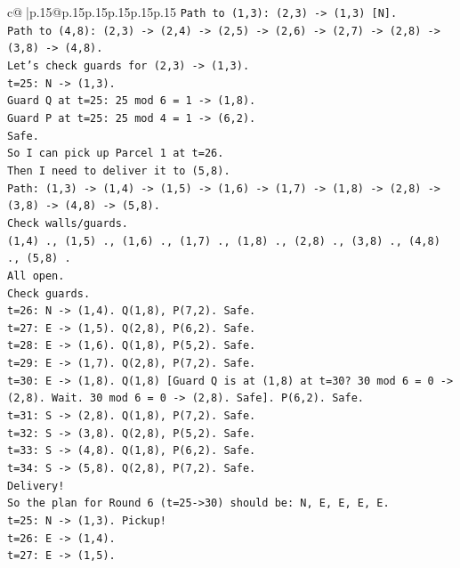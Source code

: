 \documentclass{article}
\begin{document}
{\begin{supertabular}{c@{$\;$}|p{.15\linewidth}@{}p{.15\linewidth}p{.15\linewidth}p{.15\linewidth}p{.15\linewidth}p{.15\linewidth}}
{{{\texttt{Path to (1,3): (2,3) {-}> (1,3) {[}N{]}.} \\
\texttt{Path to (4,8): (2,3) {-}> (2,4) {-}> (2,5) {-}> (2,6) {-}> (2,7) {-}> (2,8) {-}> (3,8) {-}> (4,8).} \\
\texttt{Let's check guards for (2,3) {-}> (1,3).} \\
\texttt{t=25: N {-}> (1,3).} \\
\texttt{Guard Q at t=25: 25 mod 6 = 1 {-}> (1,8).} \\
\texttt{Guard P at t=25: 25 mod 4 = 1 {-}> (6,2).} \\
\texttt{Safe.} \\
\texttt{So I can pick up Parcel 1 at t=26.} \\
\texttt{Then I need to deliver it to (5,8).} \\
\texttt{Path: (1,3) {-}> (1,4) {-}> (1,5) {-}> (1,6) {-}> (1,7) {-}> (1,8) {-}> (2,8) {-}> (3,8) {-}> (4,8) {-}> (5,8).} \\
\texttt{Check walls/guards.} \\
\texttt{(1,4) ., (1,5) ., (1,6) ., (1,7) ., (1,8) ., (2,8) ., (3,8) ., (4,8) ., (5,8) .} \\
\texttt{All open.} \\
\texttt{Check guards.} \\
\texttt{t=26: N {-}> (1,4). Q(1,8), P(7,2). Safe.} \\
\texttt{t=27: E {-}> (1,5). Q(2,8), P(6,2). Safe.} \\
\texttt{t=28: E {-}> (1,6). Q(1,8), P(5,2). Safe.} \\
\texttt{t=29: E {-}> (1,7). Q(2,8), P(7,2). Safe.} \\
\texttt{t=30: E {-}> (1,8). Q(1,8) {[}Guard Q is at (1,8) at t=30? 30 mod 6 = 0 {-}> (2,8). Wait. 30 mod 6 = 0 {-}> (2,8). Safe{]}. P(6,2). Safe.} \\
\texttt{t=31: S {-}> (2,8). Q(1,8), P(7,2). Safe.} \\
\texttt{t=32: S {-}> (3,8). Q(2,8), P(5,2). Safe.} \\
\texttt{t=33: S {-}> (4,8). Q(1,8), P(6,2). Safe.} \\
\texttt{t=34: S {-}> (5,8). Q(2,8), P(7,2). Safe.} \\
\texttt{Delivery!} \\
\texttt{So the plan for Round 6 (t=25{-}>30) should be: N, E, E, E, E.} \\
\texttt{t=25: N {-}> (1,3). Pickup!} \\
\texttt{t=26: E {-}> (1,4).} \\
\texttt{t=27: E {-}> (1,5).} \\
}}}
\end{supertabular}}
\end{document}
